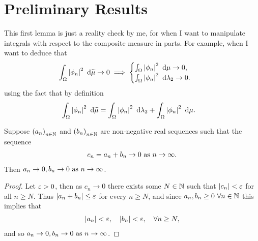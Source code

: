 \documentclass[11pt]{report}
\begin{document}
\chapter{Preliminary Results} \label{ch:PrelimResults}
This first lemma is just a reality check by me, for when I want to manipulate integrals with respect to the composite measure in parts.
For example, when I want to deduce that
\begin{align*}
	\int_{\Omega}\left\lvert \phi_n \right\rvert^2 \ \mathrm{d}\widetilde{\mu} \rightarrow 0
	&\implies
	\begin{cases}
		\int_{\Omega}\left\lvert \phi_n \right\rvert^2 \ \mathrm{d}\mu \rightarrow 0, \\
		\int_{\Omega}\left\lvert \phi_n \right\rvert^2 \ \mathrm{d}\lambda_2 \rightarrow 0.
	\end{cases}
\end{align*}
using the fact that by definition
\begin{align*}
	\int_{\Omega}\left\lvert \phi_n \right\rvert^2 \ \mathrm{d}\widetilde{\mu} &= \int_{\Omega}\left\lvert \phi_n \right\rvert^2 \ \mathrm{d}\lambda_2 + \int_{\Omega}\left\lvert \phi_n \right\rvert^2 \ \mathrm{d}\mu.
\end{align*}
\begin{lemma}
Suppose $\left( a_n \right)_{n\in\mathbb{N}}$ and $\left( b_n \right)_{n\in\mathbb{N}}$ are non-negative real sequences such that the sequence
\begin{align*}
	c_n = a_n + b_n \rightarrow 0 \ \text{as} \ n \rightarrow\infty.
\end{align*} 
Then $a_n\rightarrow0, b_n\rightarrow0 \ \text{as} \ n \rightarrow\infty$.
\end{lemma}
\begin{proof}
	Let $\varepsilon>0$, then as $c_n\rightarrow0$ there exists some $N\in\mathbb{N}$ such that $\left\lvert c_n \right\rvert<\varepsilon$ for all $n\geq N$.
	Thus $\left\lvert a_n+b_n \right\rvert\leq\varepsilon$ for every $n\geq N$, and since $a_n,b_n\geq0 \ \forall n\in\mathbb{N}$ this implies that
	\begin{align*}
		\left\lvert a_n \right\rvert<\varepsilon, \quad \left\lvert b_n \right\rvert<\varepsilon, \quad \forall n\geq N,
	\end{align*}
	and so $a_n\rightarrow0, b_n\rightarrow0 \ \text{as} \ n \rightarrow\infty$.
\end{proof}
\end{document}
